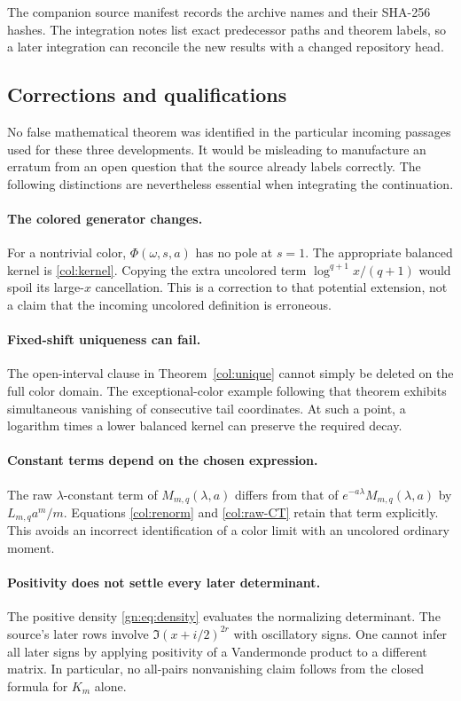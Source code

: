 The companion source manifest records the archive names and their
SHA-256 hashes. The integration notes list exact predecessor paths
and theorem labels, so a later integration can reconcile the new
results with a changed repository head.

\subsection{Corrections and qualifications}

No false mathematical theorem was identified in the particular
incoming passages used for these three developments. It would be
misleading to manufacture an erratum from an open question that
the source already labels correctly. The following distinctions
are nevertheless essential when integrating the continuation.

\paragraph{The colored generator changes.}
For a nontrivial color, $\Phi(\omega,s,a)$ has no pole at $s=1$.
The appropriate balanced kernel is \eqref{col:kernel}. Copying
the extra uncolored term $\log^{q+1}x/(q+1)$ would spoil its
large-$x$ cancellation. This is a correction to that potential
extension, not a claim that the incoming uncolored definition
is erroneous.

\paragraph{Fixed-shift uniqueness can fail.}
The open-interval clause in Theorem~\ref{col:unique} cannot simply
be deleted on the full color domain. The exceptional-color
example following that theorem exhibits simultaneous vanishing
of consecutive tail coordinates. At such a point, a logarithm
times a lower balanced kernel can preserve the required decay.

\paragraph{Constant terms depend on the chosen expression.}
The raw $\lambda$-constant term of
$M_{m,q}(\lambda,a)$ differs from that of
$e^{-a\lambda}M_{m,q}(\lambda,a)$ by $L_{m,q}a^m/m$.
Equations \eqref{col:renorm} and \eqref{col:raw-CT} retain that
term explicitly. This avoids an incorrect identification of a
color limit with an uncolored ordinary moment.

\paragraph{Positivity does not settle every later determinant.}
The positive density \eqref{gn:eq:density} evaluates the
normalizing determinant. The source's later rows involve
$\Im(x+i/2)^{2r}$ with oscillatory signs. One cannot infer all
later signs by applying positivity of a Vandermonde product to
a different matrix. In particular, no all-pairs nonvanishing
claim follows from the closed formula for $K_m$ alone.

